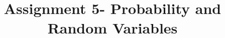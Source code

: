 \documentclass[journal,12pt,twocolumn]{IEEEtran}
\DeclareMathOperator*{\Res}{Res}
\begin{document}
\newcommand{\BEQA}{\begin{eqnarray}}
\newcommand{\EEQA}{\end{eqnarray}}
\newcommand{\define}{\stackrel{\triangle}{=}}

\raggedbottom
\setlength{\parindent}{0pt}
\providecommand{\mbf}{\mathbf}
\providecommand{\pr}[1]{\ensuremath{\Pr\left(#1\right)}}
\providecommand{\qfunc}[1]{\ensuremath{Q\left(#1\right)}}
\providecommand{\sbrak}[1]{\ensuremath{{}\left[#1\right]}}
\providecommand{\lsbrak}[1]{\ensuremath{{}\left[#1\right.}}
\providecommand{\rsbrak}[1]{\ensuremath{{}\left.#1\right]}}
\providecommand{\brak}[1]{\ensuremath{\left(#1\right)}}
\providecommand{\lbrak}[1]{\ensuremath{\left(#1\right.}}
\providecommand{\rbrak}[1]{\ensuremath{\left.#1\right)}}
\providecommand{\cbrak}[1]{\ensuremath{\left\{#1\right\}}}
\providecommand{\lcbrak}[1]{\ensuremath{\left\{#1\right.}}
\providecommand{\rcbrak}[1]{\ensuremath{\left.#1\right\}}}
\theoremstyle{remark}
\newtheorem{rem}{Remark}
\newcommand{\sgn}{\mathop{\mathrm{sgn}}}
\providecommand{\abs}[1]{\vert#1\vert}
\providecommand{\res}[1]{\Res\displaylimits_{#1}} 
\providecommand{\norm}[1]{\lVert#1\rVert}
\providecommand{\mtx}[1]{\mathbf{#1}}
\providecommand{\mean}[1]{E[ #1 ]}
\providecommand{\fourier}{\overset{\mathcal{F}}{ \rightleftharpoons}}
\providecommand{\system}{\overset{\mathcal{H}}{ \longleftrightarrow}}
\newcommand{\solution}{\noindent \textbf{Solution: }}
\newcommand{\cosec}{\,\text{cosec}\,}
\providecommand{\dec}[2]{\ensuremath{\overset{#1}{\underset{#2}{\gtrless}}}}
\newcommand{\myvec}[1]{\ensuremath{\begin{pmatrix}#1\end{pmatrix}}}
\newcommand{\mydet}[1]{\ensuremath{\begin{vmatrix}#1\end{vmatrix}}}
\makeatletter
{}
\makeatother
\let\StandardTheFigure\thefigure
\let\vec\mathbf
\renewcommand{\thefigure}{\theproblem}
\def\putbox#1#2#3{\makebox[0in][l]{\makebox[#1][l]{}\raisebox{\baselineskip}[0in][0in]{\raisebox{#2}[0in][0in]{#3}}}}
     \def\rightbox#1{\makebox[0in][r]{#1}}
     \def\centbox#1{\makebox[0in]{#1}}
     \def\topbox#1{\raisebox{-\baselineskip}[0in][0in]{#1}}
     \def\midbox#1{\raisebox{-0.5\baselineskip}[0in][0in]{#1}}
\vspace{3cm}
\title{Assignment 5- Probability and Random Variables}
\end{document}
